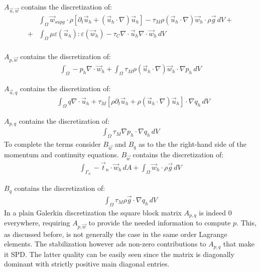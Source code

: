 \noindent $A_{\vec{u}, \vec{w}}$ contains the discretization of:
\begin{equation*}
	\begin{split}
		&\int_{\Omega} \vec{w}_{supg}\cdot\rho\left[\partial_t \vec{u}_h + (\vec{u}_h\cdot\nabla)\vec{u}_h \right] - \tau_M\rho(\vec{u}_h\cdot\nabla)\vec{w}_h\cdot\rho\vec{g}\,dV +\\
		+&\int_{\Omega} \mu\varepsilon(\vec{u}_h):\varepsilon(\vec{w}_h) -\tau_C\nabla\cdot\vec{u}_h\nabla\cdot\vec{w}_h\,dV\\
	\end{split}
\end{equation*}

\noindent $A_{p, \vec{w}}$ contains the discretization of:
\begin{equation*}
	\begin{split}
		\int_{\Omega} -p_h\nabla\cdot\vec{w}_h + \int_{\Omega} \tau_M \rho(\vec{u}_h\cdot\nabla)\vec{w}_h\cdot \nabla p_h\,dV
	\end{split}
\end{equation*}

\noindent $A_{\vec{u}, q}$ contains the discretization of:
\begin{equation*}
	\begin{split}
		&\int_{\Omega} q\nabla\cdot\vec{u}_h + \tau_M \left[\rho\partial_t \vec{u}_h + \rho(\vec{u}_{h}\cdot\nabla)\vec{u}_h\right] \cdot \nabla q_h\,dV
	\end{split}
\end{equation*}

\noindent $A_{p, q}$ contains the discretization of:
\begin{equation*}
	\begin{split}
		\int_{\Omega} \tau_M \nabla p_h \cdot \nabla q_h\,dV
	\end{split}
\end{equation*}
To complete the terms consider $B_{\vec{w}}$ and $B_q$ as to the the right-hand side of the momentum and continuity equations.
\noindent $B_{\vec{w}}$ contains the discretization of:
\begin{equation*}
	\begin{split}
		\int_{\Gamma_n} -\vec{t}_{n}\cdot\vec{w}_h \,dA + \int_{\Omega} \vec{w}_{h}\cdot\rho \vec{g} \,dV
	\end{split}
\end{equation*}

\noindent $B_{q}$ contains the discretization of:
\begin{equation*}
	\begin{split}
		\int_{\Omega} \tau_M \rho \vec{g} \cdot \nabla q_h\,dV
	\end{split}
\end{equation*}
In a plain Galerkin discretization the square block matrix $A_{p, q}$ is indeed 0 everywhere, requiring $A_{p, \vec{w}}$ to provide the needed information to compute $p$. This, as discussed before, is not generally the case in the same order Lagrange elements. The stabilization however ads non-zero contributions to $A_{p, q}$ that make it SPD\@. The latter quality can be easily seen since the matrix is diagonally dominant with strictly positive main diagonal entries.

